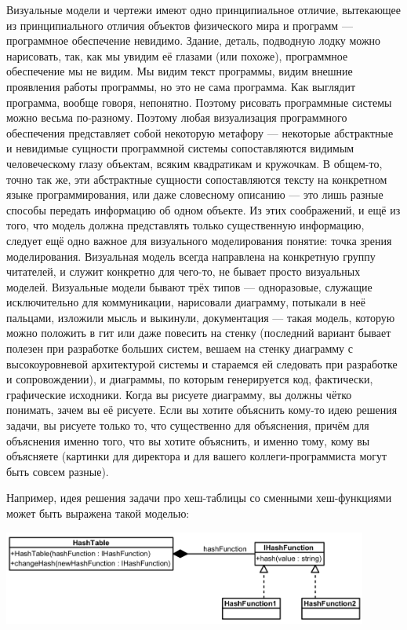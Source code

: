 \documentclass[a5paper]{article}
\begin{document}
Визуальные модели и чертежи имеют одно принципиальное отличие, вытекающее из принципиального отличия объектов физического мира и программ --- программное обеспечение невидимо. Здание, деталь, подводную лодку можно нарисовать, так, как мы увидим её глазами (или похоже), программное обеспечение мы не видим. Мы видим текст программы, видим внешние проявления работы программы, но это не сама программа. Как выглядит программа, вообще говоря, непонятно. Поэтому рисовать программные системы можно весьма по-разному. Поэтому любая визуализация программного обеспечения представляет собой некоторую метафору --- некоторые абстрактные и невидимые сущности программной системы сопоставляются видимым человеческому глазу объектам, всяким квадратикам и кружочкам. В общем-то, точно так же, эти абстрактные сущности сопоставляются тексту на конкретном языке программирования, или даже словесному описанию --- это лишь разные способы передать информацию об одном объекте. Из этих соображений, и ещё из того, что модель должна представлять только существенную информацию, следует ещё одно важное для визуального моделирования понятие: точка зрения моделирования. Визуальная модель всегда направлена на конкретную группу читателей, и служит конкретно для чего-то, не бывает просто визуальных моделей. Визуальные модели бывают трёх типов --- одноразовые, служащие исключительно для коммуникации, нарисовали диаграмму, потыкали в неё пальцами, изложили мысль и выкинули, документация --- такая модель, которую можно положить в гит или даже повесить на стенку (последний вариант бывает полезен при разработке больших систем, вешаем на стенку диаграмму с высокоуровневой архитектурой системы и стараемся ей следовать при разработке и сопровождении), и диаграммы, по которым генерируется код, фактически, графические исходники. Когда вы рисуете диаграмму, вы должны чётко понимать, зачем вы её рисуете. Если вы хотите объяснить кому-то идею решения задачи, вы рисуете только то, что существенно для объяснения, причём для объяснения именно того, что вы хотите объяснить, и именно тому, кому вы объясняете (картинки для директора и для вашего коллеги-программиста могут быть совсем разные).

Например, идея решения задачи про хеш-таблицы со сменными хеш-функциями может быть выражена такой моделью:

\begin{center}
	\includegraphics[width=0.9\textwidth]{modelExample.png}
\end{center}
\end{document}
